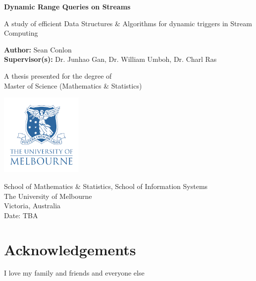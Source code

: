 \documentclass{article}
\begin{document}
\begin{titlepage}
   \begin{center}
       \vspace*{1cm}

       \textbf{Dynamic Range Queries on Streams}

       \vspace{0.5cm}
        A study of efficient Data Structures \& Algorithms for dynamic triggers in Stream Computing
            
       \vspace{1.5cm}

       \textbf{Author:} Sean Conlon \\
       \textbf{Supervisor(s):} Dr. Junhao Gan, Dr. William Umboh, Dr. Charl Ras

       \vfill
            
       A thesis presented for the degree of\\
       Master of Science (Mathematics \& Statistics) 
            
       \vspace{0.8cm}
     
       \includegraphics[width=0.3\textwidth]{images/uomlogo.png}
            
       School of Mathematics \& Statistics, School of Information Systems\\
       The University of Melbourne\\
       Victoria, Australia\\
       Date: TBA
            
   \end{center}
\end{titlepage}



\newpage
\section*{Acknowledgements}
I love my family and friends and everyone else 



\newpage
\tableofcontents
\thispagestyle{empty}
\clearpage
\setcounter{page}{1}




\newpage
 




\newpage

\newpage




\newpage

\end{document}
